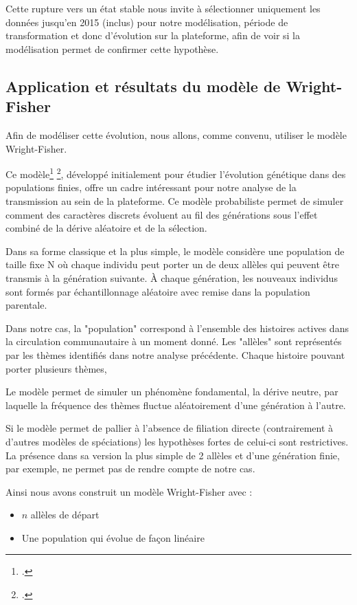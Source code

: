 \documentclass[12pt,a4paper,oneside,titlepage]{book} %
\begin{document}
Cette rupture vers un état stable nous invite à sélectionner uniquement les données jusqu'en 2015 (inclus) pour notre modélisation, période de transformation et donc d'évolution sur la plateforme, afin de voir si la modélisation permet de confirmer cette hypothèse.

\subsection{Application et résultats du modèle de Wright-Fisher}

Afin de modéliser cette évolution, nous allons, comme convenu, utiliser le modèle Wright-Fisher.

Ce modèle\footcite{wright1931evolution} \footcite{fisher1999genetical}, développé initialement pour étudier l'évolution génétique dans des populations finies, offre un cadre intéressant pour notre analyse de la transmission au sein de la plateforme. Ce modèle probabiliste permet de simuler comment des caractères discrets évoluent au fil des générations sous l'effet combiné de la dérive aléatoire et de la sélection.

Dans sa forme classique et la plus simple, le modèle considère une population de taille fixe N où chaque individu peut porter un de deux allèles qui peuvent être transmis à la génération suivante. À chaque génération, les nouveaux individus sont formés par échantillonnage aléatoire avec remise dans la population parentale.

Dans notre cas, la "population" correspond à l'ensemble des histoires actives dans la circulation communautaire à un moment donné. Les "allèles" sont représentés par les thèmes identifiés dans notre analyse précédente. Chaque histoire pouvant porter plusieurs thèmes,

Le modèle permet de simuler un phénomène fondamental, la dérive neutre, par laquelle la fréquence des thèmes fluctue aléatoirement d'une génération à l'autre.

Si le modèle permet de pallier à l'absence de filiation directe (contrairement à d'autres modèles de spéciations) les hypothèses fortes de celui-ci sont restrictives. La présence dans sa version la plus simple de 2 allèles et d'une génération finie, par exemple, ne permet pas de rendre compte de notre cas. 

Ainsi nous avons construit un modèle Wright-Fisher avec : 
\begin{itemize}
    \item  $n$ allèles de départ 
    \item Une population qui évolue de façon linéaire
\end{itemize}
\end{document}
